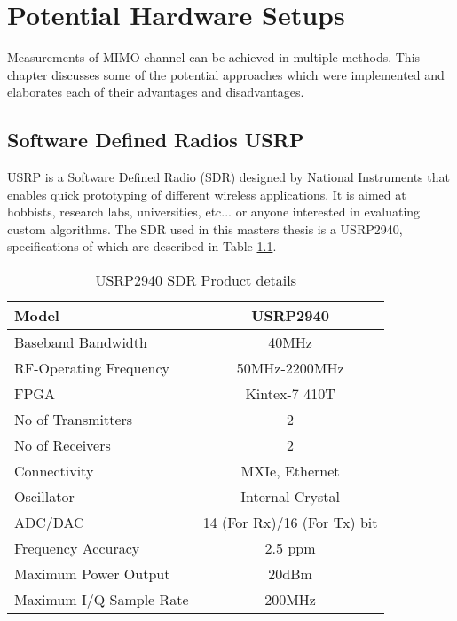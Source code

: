 \chapter{Potential Hardware Setups}
\label{ch:PotenHWSetup}

Measurements of MIMO channel can be achieved in multiple methods. This chapter discusses some of the potential approaches which were implemented and elaborates each of their advantages and disadvantages.

\section{Software Defined Radios USRP}\label{sec:USRP}

USRP is a Software Defined Radio (SDR) designed by National Instruments that enables quick prototyping of different wireless applications. It is aimed at hobbists, research labs, universities, etc... or anyone interested in evaluating custom algorithms. The SDR used in this masters thesis is a USRP2940, specifications of which are described in Table \ref{tb:USRP}.

\begin{table}[H]
    \begin{center}
        \begin{tabular}{|l|c|}
        \hline
            Model                   & USRP2940          \\ \hline
            Baseband Bandwidth      & 40MHz             \\ \hline
            RF-Operating Frequency  & 50MHz-2200MHz     \\ \hline
            FPGA                    & Kintex-7 410T     \\ \hline
            No of Transmitters      & 2                 \\ \hline
            No of Receivers         & 2                 \\ \hline
            Connectivity            & MXIe, Ethernet    \\ \hline
            Oscillator              & Internal Crystal  \\ \hline
            ADC/DAC                 & 14 (For Rx)/16 (For Tx) bit         \\ \hline
            Frequency Accuracy      & 2.5 ppm           \\ \hline
            Maximum Power Output    & 20dBm             \\ \hline
            Maximum I/Q Sample Rate & 200MHz            \\ \hline
        \end{tabular}
    \end{center}
    \caption{USRP2940 SDR Product details}
    \label{tb:USRP}
\end{table}

